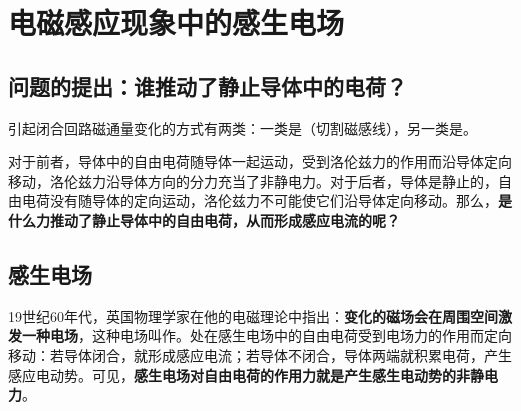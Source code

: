 \section{电磁感应现象中的感生电场}

\subsection{问题的提出：谁推动了静止导体中的电荷？}

引起闭合回路磁通量变化的方式有两类：一类是（切割磁感线），另一类是。

对于前者，导体中的自由电荷随导体一起运动，受到洛伦兹力的作用而沿导体定向移动，洛伦兹力沿导体方向的分力充当了非静电力。对于后者，导体是静止的，自由电荷没有随导体的定向运动，洛伦兹力不可能使它们沿导体定向移动。那么，\textbf{是什么力推动了静止导体中的自由电荷，从而形成感应电流的呢？}

\subsection{感生电场}

19世纪60年代，英国物理学家在他的电磁理论中指出：\textbf{变化的磁场会在周围空间激发一种电场}，这种电场叫作。处在感生电场中的自由电荷受到电场力的作用而定向移动：若导体闭合，就形成感应电流；若导体不闭合，导体两端就积累电荷，产生感应电动势。可见，\textbf{感生电场对自由电荷的作用力就是产生感生电动势的非静电力}。

